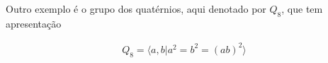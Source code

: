 	
	
	\par\vspace{0.3cm} Outro exemplo é o grupo dos quatérnios, aqui denotado por $Q_8$, que tem apresentação
	
	\begin{align}
	Q_8 = \langle a,b| a^2=b^2=(ab)^2 \rangle
	\label{apresentacao quaternios}
	\end{align}
	
	
	
	
